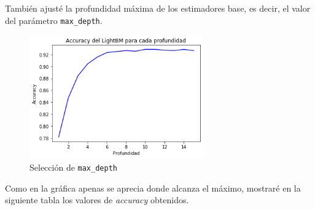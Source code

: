 \documentclass[a4]{article}
\begin{document}
\begin{figure}[H]
  \centering
\end{figure}


\vspace{-8mm}
También ajusté la profundidad máxima de los estimadores base, es decir, el valor del parámetro \texttt{max\_depth}.

\begin{figure}[H]
  \centering
  \caption{Selección de \texttt{max\_depth}}
  \includegraphics[width=75mm]{imagenes/p3_09_depth}
\end{figure}

 Como en la gráfica apenas se aprecia donde alcanza el máximo, mostraré en la siguiente tabla los valores de \textit{accuracy} obtenidos.
\end{document}
